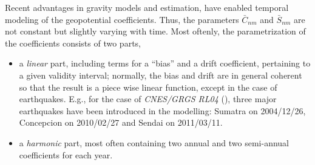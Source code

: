 Recent advantages in gravity models and estimation, have enabled temporal modeling 
of the geopotential coefficients. Thus, the parameters $\bar{C}_{nm}$ and 
$\bar{S}_{nm}$ are not constant but slightly varying with time. Most oftenly, the 
parametrization of the coefficients consists of two parts, 
\begin{itemize}
  \item a \emph{linear} part, including terms for a ``bias'' and a drift coefficient, pertaining 
    to a given validity interval; normally, the bias and drift are in general coherent 
    so that the result is a piece wise linear function, except in the case of earthquakes.
    E.g., for the case of \emph{CNES/GRGS RL04} (\cite{lemoine-rl04}), three major 
    earthquakes have been introduced in the modelling: Sumatra on 2004/12/26, Concepcion 
    on 2010/02/27 and Sendai on 2011/03/11.
  \item a \emph{harmonic} part, most often containing two annual and two semi-annual 
    coefficients for each year.
\end{itemize}


